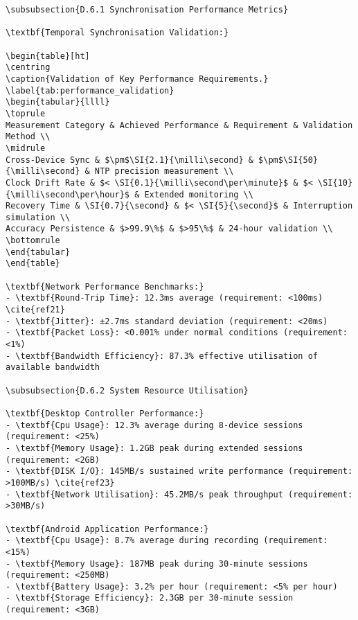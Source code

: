\begin{verbatim}
\subsubsection{D.6.1 Synchronisation Performance Metrics}

\textbf{Temporal Synchronisation Validation:}

\begin{table}[ht]
\centring
\caption{Validation of Key Performance Requirements.}
\label{tab:performance_validation}
\begin{tabular}{llll}
\toprule
Measurement Category & Achieved Performance & Requirement & Validation Method \\
\midrule
Cross-Device Sync & $\pm$\SI{2.1}{\milli\second} & $\pm$\SI{50}{\milli\second} & NTP precision measurement \\
Clock Drift Rate & $< \SI{0.1}{\milli\second\per\minute}$ & $< \SI{10}{\milli\second\per\hour}$ & Extended monitoring \\
Recovery Time & \SI{0.7}{\second} & $< \SI{5}{\second}$ & Interruption simulation \\
Accuracy Persistence & $>99.9\%$ & $>95\%$ & 24-hour validation \\
\bottomrule
\end{tabular}
\end{table}

\textbf{Network Performance Benchmarks:}
- \textbf{Round-Trip Time}: 12.3ms average (requirement: <100ms) \cite{ref21}
- \textbf{Jitter}: ±2.7ms standard deviation (requirement: <20ms)
- \textbf{Packet Loss}: <0.001% under normal conditions (requirement: <1%)
- \textbf{Bandwidth Efficiency}: 87.3% effective utilisation of available bandwidth

\subsubsection{D.6.2 System Resource Utilisation}

\textbf{Desktop Controller Performance:}
- \textbf{Cpu Usage}: 12.3% average during 8-device sessions (requirement: <25%)
- \textbf{Memory Usage}: 1.2GB peak during extended sessions (requirement: <2GB)
- \textbf{DISK I/O}: 145MB/s sustained write performance (requirement: >100MB/s) \cite{ref23}
- \textbf{Network Utilisation}: 45.2MB/s peak throughput (requirement: >30MB/s)

\textbf{Android Application Performance:}
- \textbf{Cpu Usage}: 8.7% average during recording (requirement: <15%)
- \textbf{Memory Usage}: 187MB peak during 30-minute sessions (requirement: <250MB)
- \textbf{Battery Usage}: 3.2% per hour (requirement: <5% per hour)
- \textbf{Storage Efficiency}: 2.3GB per 30-minute session (requirement: <3GB)


\end{verbatim}
